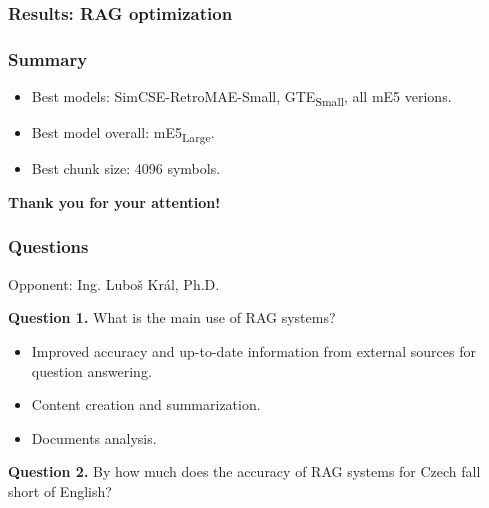\documentclass{beamer}
\begin{document}
\begin{frame}
  \frametitle{Results: RAG optimization}
  
\end{frame}

\begin{frame}
  \frametitle{Summary}
  \begin{itemize}
    \item Best models: SimCSE-RetroMAE-Small, GTE\textsubscript{Small}, all mE5 verions.
    \item Best model overall: mE5\textsubscript{Large}.
    \item Best chunk size: 4096 symbols.
  \end{itemize}
  \textcolor{cvut_navy}{\textbf{Thank you for your attention!}}
\end{frame}

\begin{frame}
  \frametitle{Questions}
  Opponent: Ing. Luboš Král, Ph.D.

  \textcolor{cvut_navy}{\textbf{Question 1.}} What is the main use of RAG systems?
  \begin{itemize}
    \item Improved accuracy and up-to-date information from external sources for question answering.
    \item Content creation and summarization.
    \item Documents analysis.
  \end{itemize}
  \textcolor{cvut_navy}{\textbf{Question 2.}} By how much does the accuracy of RAG systems for Czech fall short of English?
\end{frame}
\end{document}
